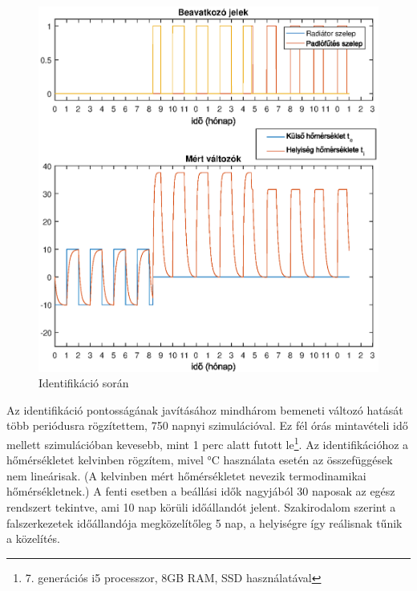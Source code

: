



\begin{figure}[H]
	\centering
	\includegraphics[trim=0 0 0 0, clip,width=\textwidth]{figures/ident-valve3}
	\caption{Identifikáció során }
	\label{fig:ident}
\end{figure}

Az identifikáció pontosságának javításához mindhárom bemeneti változó hatását több periódusra rögzítettem, 750 napnyi szimulációval. Ez fél órás mintavételi idő mellett szimulációban kevesebb, mint 1 perc alatt futott le\footnote{7. generációs i5 processzor, 8GB RAM, SSD használatával}. Az identifikációhoz a hőmérsékletet kelvinben rögzítem, mivel \si{\celsius} használata esetén az összefüggések nem lineárisak. (A kelvinben mért hőmérsékletet nevezik termodinamikai hőmérsékletnek.) A fenti esetben a beállási idők nagyjából 30 naposak az egész rendszert tekintve, ami 10 nap körüli időállandót jelent. Szakirodalom szerint a falszerkezetek időállandója megközelítőleg 5 nap, a helyiségre így reálisnak tűnik a közelítés.

